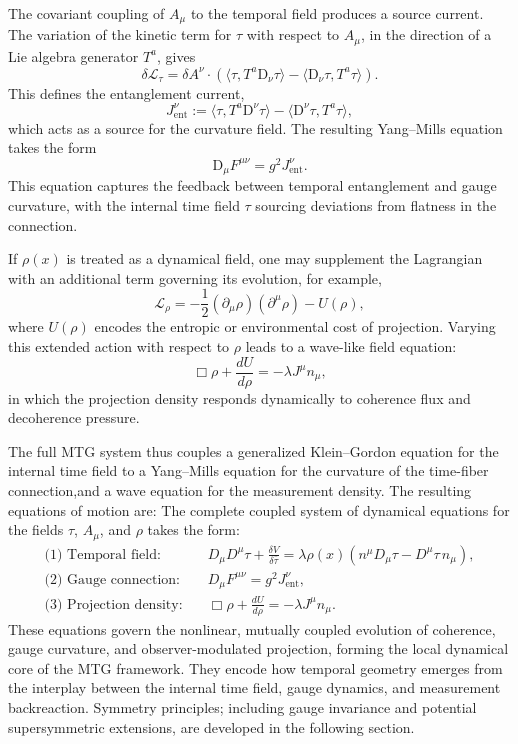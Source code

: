 \documentclass[11pt]{article}
\begin{document}
The covariant coupling of \( A_\mu \) to the temporal field produces a source current. The variation of the kinetic term for \( \tau \) with respect to \( A_\mu \), in the direction of a Lie algebra generator \( T^a \), gives
\[
\delta \mathcal{L}_\tau = \delta A^\nu \cdot \left( \langle \tau, T^a \mathrm{D}_\nu \tau \rangle - \langle \mathrm{D}_\nu \tau, T^a \tau \rangle \right).
\]
This defines the entanglement current,
\begin{equation}
J^{\nu}_{\mathrm{ent}} := \langle \tau, T^a \mathrm{D}^\nu \tau \rangle - \langle \mathrm{D}^\nu \tau, T^a \tau \rangle,
\end{equation}
which acts as a source for the curvature field. The resulting Yang--Mills equation takes the form
\begin{equation}\label{eq:y-m}
\mathrm{D}_\mu F^{\mu\nu} = g^2 J^{\nu}_{\mathrm{ent}}.
\end{equation}
This equation captures the feedback between temporal entanglement and gauge curvature, with the internal time field \( \tau \) sourcing deviations from flatness in the connection.

If \( \rho(x) \) is treated as a dynamical field, one may supplement the Lagrangian with an additional term governing its evolution, for example,
\[
\mathcal{L}_\rho = -\frac{1}{2} (\partial_\mu \rho)(\partial^\mu \rho) - U(\rho),
\]
where \( U(\rho) \) encodes the entropic or environmental cost of projection. Varying this extended action with respect to \( \rho \) leads to a wave-like field equation:
\begin{equation}
\Box \rho + \frac{dU}{d\rho} = -\lambda J^\mu n_\mu,
\end{equation}
in which the projection density responds dynamically to coherence flux and decoherence pressure.

The full MTG system thus couples a generalized Klein--Gordon equation for the internal time field to a Yang--Mills equation for the curvature of the time-fiber connection,and  a wave equation for the measurement density. The resulting equations of motion are:
The complete coupled system of dynamical equations for the fields \( \tau \), \( A_\mu \), and \( \rho \) takes the form:
\begin{align}
\text{(1) Temporal field:} \quad & D_\mu D^\mu \tau + \frac{\delta V}{\delta \bar{\tau}} = \lambda \rho(x) \left( n^\mu D_\mu \tau - D^\mu \tau \, n_\mu \right), \label{eq:eom-tau} \\
\text{(2) Gauge connection:} \quad & D_\mu F^{\mu\nu} = g^2 J^\nu_{\mathrm{ent}}, \label{eq:eom-A} \\
\text{(3) Projection density:} \quad & \Box \rho + \frac{dU}{d\rho} = -\lambda J^\mu n_\mu. \label{eq:eom-rho}
\end{align}
These equations govern the nonlinear, mutually coupled evolution of coherence, gauge curvature, and observer-modulated projection, forming the local dynamical core of the MTG framework. They encode how temporal geometry emerges from the interplay between the internal time field, gauge dynamics, and measurement backreaction. Symmetry principles; including gauge invariance and potential supersymmetric extensions, are developed in the following section.
\end{document}
